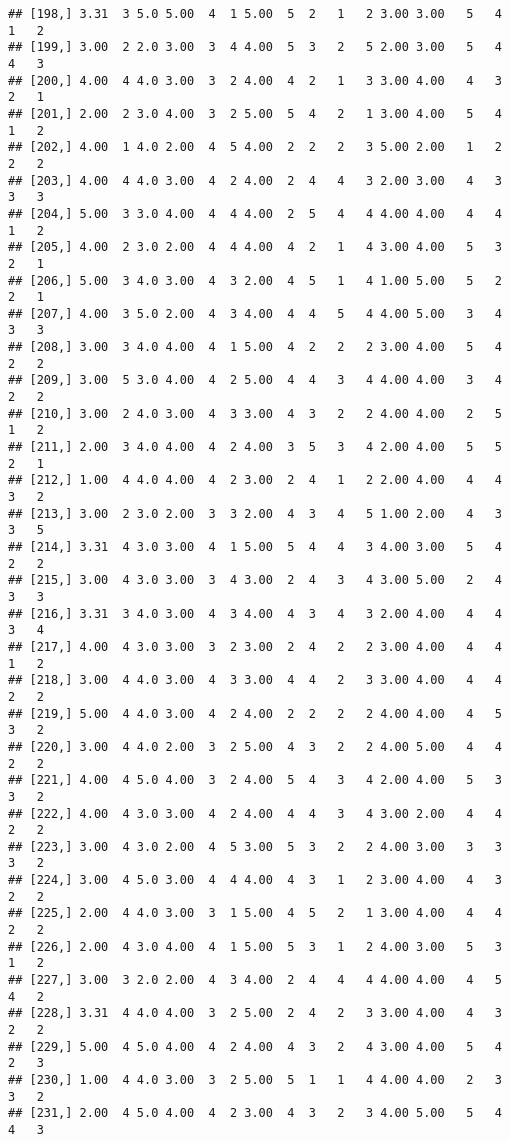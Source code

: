 \documentclass[]{article}
\begin{document}
\begin{verbatim}
## [198,] 3.31  3 5.0 5.00  4  1 5.00  5  2   1   2 3.00 3.00   5   4   1   2
## [199,] 3.00  2 2.0 3.00  3  4 4.00  5  3   2   5 2.00 3.00   5   4   4   3
## [200,] 4.00  4 4.0 3.00  3  2 4.00  4  2   1   3 3.00 4.00   4   3   2   1
## [201,] 2.00  2 3.0 4.00  3  2 5.00  5  4   2   1 3.00 4.00   5   4   1   2
## [202,] 4.00  1 4.0 2.00  4  5 4.00  2  2   2   3 5.00 2.00   1   2   2   2
## [203,] 4.00  4 4.0 3.00  4  2 4.00  2  4   4   3 2.00 3.00   4   3   3   3
## [204,] 5.00  3 3.0 4.00  4  4 4.00  2  5   4   4 4.00 4.00   4   4   1   2
## [205,] 4.00  2 3.0 2.00  4  4 4.00  4  2   1   4 3.00 4.00   5   3   2   1
## [206,] 5.00  3 4.0 3.00  4  3 2.00  4  5   1   4 1.00 5.00   5   2   2   1
## [207,] 4.00  3 5.0 2.00  4  3 4.00  4  4   5   4 4.00 5.00   3   4   3   3
## [208,] 3.00  3 4.0 4.00  4  1 5.00  4  2   2   2 3.00 4.00   5   4   2   2
## [209,] 3.00  5 3.0 4.00  4  2 5.00  4  4   3   4 4.00 4.00   3   4   2   2
## [210,] 3.00  2 4.0 3.00  4  3 3.00  4  3   2   2 4.00 4.00   2   5   1   2
## [211,] 2.00  3 4.0 4.00  4  2 4.00  3  5   3   4 2.00 4.00   5   5   2   1
## [212,] 1.00  4 4.0 4.00  4  2 3.00  2  4   1   2 2.00 4.00   4   4   3   2
## [213,] 3.00  2 3.0 2.00  3  3 2.00  4  3   4   5 1.00 2.00   4   3   3   5
## [214,] 3.31  4 3.0 3.00  4  1 5.00  5  4   4   3 4.00 3.00   5   4   2   2
## [215,] 3.00  4 3.0 3.00  3  4 3.00  2  4   3   4 3.00 5.00   2   4   3   3
## [216,] 3.31  3 4.0 3.00  4  3 4.00  4  3   4   3 2.00 4.00   4   4   3   4
## [217,] 4.00  4 3.0 3.00  3  2 3.00  2  4   2   2 3.00 4.00   4   4   1   2
## [218,] 3.00  4 4.0 3.00  4  3 3.00  4  4   2   3 3.00 4.00   4   4   2   2
## [219,] 5.00  4 4.0 3.00  4  2 4.00  2  2   2   2 4.00 4.00   4   5   3   2
## [220,] 3.00  4 4.0 2.00  3  2 5.00  4  3   2   2 4.00 5.00   4   4   2   2
## [221,] 4.00  4 5.0 4.00  3  2 4.00  5  4   3   4 2.00 4.00   5   3   3   2
## [222,] 4.00  4 3.0 3.00  4  2 4.00  4  4   3   4 3.00 2.00   4   4   2   2
## [223,] 3.00  4 3.0 2.00  4  5 3.00  5  3   2   2 4.00 3.00   3   3   3   2
## [224,] 3.00  4 5.0 3.00  4  4 4.00  4  3   1   2 3.00 4.00   4   3   2   2
## [225,] 2.00  4 4.0 3.00  3  1 5.00  4  5   2   1 3.00 4.00   4   4   2   2
## [226,] 2.00  4 3.0 4.00  4  1 5.00  5  3   1   2 4.00 3.00   5   3   1   2
## [227,] 3.00  3 2.0 2.00  4  3 4.00  2  4   4   4 4.00 4.00   4   5   4   2
## [228,] 3.31  4 4.0 4.00  3  2 5.00  2  4   2   3 3.00 4.00   4   3   2   2
## [229,] 5.00  4 5.0 4.00  4  2 4.00  4  3   2   4 3.00 4.00   5   4   2   3
## [230,] 1.00  4 4.0 3.00  3  2 5.00  5  1   1   4 4.00 4.00   2   3   3   2
## [231,] 2.00  4 5.0 4.00  4  2 3.00  4  3   2   3 4.00 5.00   5   4   4   3

\end{verbatim}
\end{document}
